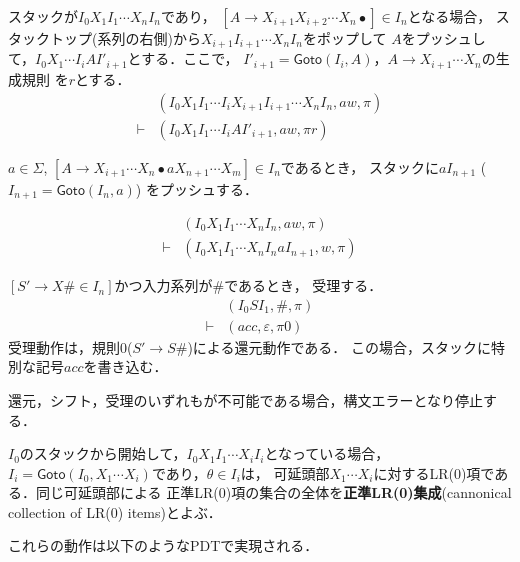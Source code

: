 \documentclass[dvipdfmx,a4j]{jbook}
\begin{document}
\begin{list}{}{}
  \item [{\bf 還元}]
  スタックが$I_0X_1I_1\cdots X_{n}I_n$であり，
$[A\rightarrow X_{i+1}X_{i+2}\cdots X_n\bullet]\in I_n$となる場合，
スタックトップ(系列の右側)から$X_{i+1}I_{i+1}\cdots X_nI_n$をポップして
$A$をプッシュして，$I_0X_1\cdots I_iAI'_{i+1}$とする．ここで，
$I'_{i+1}=\mathsf{Goto}(I_i,A)$，$A\rightarrow X_{i+1}\cdots X_n$の生成規則
を$r$とする．
\[\begin{array}{cl}
  & (I_0X_1I_1\cdots I_iX_{i+1}I_{i+1}\cdots X_nI_n,aw,\pi)\\
  \vdash & (I_0X_1I_1\cdots I_iAI'_{i+1},aw,\pi r)
\end{array}\]

  \item [{\bf シフト}]
  $a\in\Sigma$,
  $[A\rightarrow X_{i+1}\cdots X_n\bullet a X_{n+1}\cdots X_m]\in I_n$であるとき，
  スタックに$a I_{n+1}$ ($I_{n+1}=\mathsf{Goto}(I_n,a)$) をプッシュする．

  \[\begin{array}{cl}
      & (I_0X_1I_1\cdots X_nI_n,aw,\pi)\\
  \vdash & (I_0X_1I_1\cdots X_nI_n a I_{n+1},w,\pi)
  \end{array}
  \]
  \item [{\bf 受理}]
  $[S'\rightarrow X\texttt{\#}\in I_n]$かつ入力系列が$\texttt{\#}$であるとき，
  受理する．
  \[\begin{array}{cl}
    & (I_0SI_1,\texttt{\#},\pi)\\
  \vdash & (acc,\varepsilon,\pi 0)
  \end{array}\]
  受理動作は，規則0($S'\rightarrow S\texttt{\#}$)による還元動作である．
  この場合，スタックに特別な記号$acc$を書き込む．
  \item [{\bf エラー}]
  還元，シフト，受理のいずれもが不可能である場合，構文エラーとなり停止する．
\end{list}

$I_0$のスタックから開始して，$I_0X_1I_1\cdots X_iI_i$となっている場合，
$I_i=\mathsf{Goto}(I_0,X_1\cdots X_i)$であり，$\theta\in I_i$は，
可延頭部$X_1\cdots X_i$に対するLR(0)項である．同じ可延頭部による
正準LR(0)項の集合の全体を{\bf 正準LR(0)集成}(cannonical collection of
LR(0) items)とよぶ．

これらの動作は以下のようなPDTで実現される．
\end{document}
